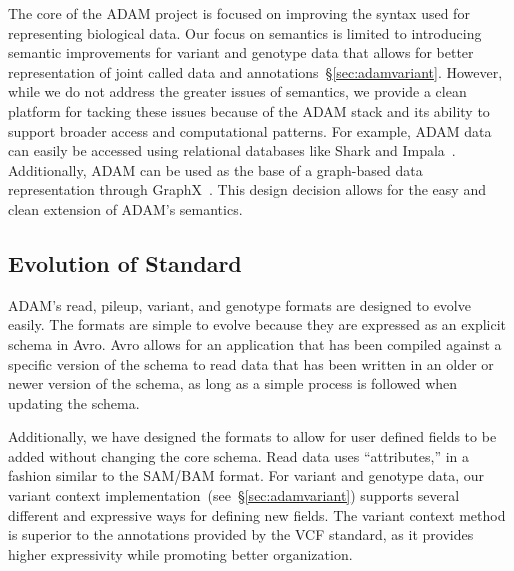 \documentclass{bioinfo}
\begin{document}
The core of the ADAM project is focused on improving the syntax used for representing biological data. Our focus on semantics is limited to introducing semantic improvements
for variant and genotype data that allows for better representation of joint called data and annotations~\S\ref{sec:adamvariant}. However, while we do not address the greater
issues of semantics, we provide a clean platform for tacking these issues because of the ADAM stack and its ability to support broader access and computational patterns.
For example, ADAM data can easily be accessed using relational databases like Shark and Impala~\citep{xin13shark, impala}. Additionally, ADAM can be used as the base
of a graph-based data representation through GraphX~\citep{xin13graphx}. This design decision allows for the easy and clean extension of ADAM's semantics.

\subsection{Evolution of Standard}
\label{sec:evolution-of-standard}

ADAM's read, pileup, variant, and genotype formats are designed to evolve easily. The formats are simple to evolve because they are expressed as an explicit schema
in Avro. Avro allows for an application that has been compiled against a specific version of the schema to read data that has been written in an older or newer version of the
schema, as long as a simple process is followed when updating the schema.

Additionally, we have designed the formats to allow for user defined fields to be added without changing the core schema. Read data uses ``attributes,'' in a fashion similar to
the SAM/BAM format. For variant and genotype data, our variant context implementation~(see~\S\ref{sec:adamvariant}) supports several different and expressive ways for
defining new fields. The variant context method is superior to the annotations provided by the VCF standard, as it provides higher expressivity while promoting better
organization.

\end{document}
